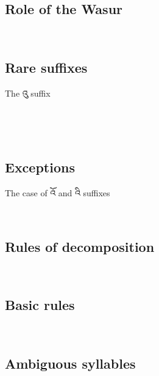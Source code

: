 \documentclass[%
a4paper,%
pagesize,%
12pt,%
parskip=off,%
bibliography=totoc,%
numbers=noenddot,%
DIV=12,%
twoside=semi,%
headings=normal%
]{scrartcl}
\begin{document}
\subsection{Role of the Wasur}

­\subsection{Rare suffixes}
The འུ suffix

­ 

­\subsection{Exceptions}

The case of འོ and འི suffixes

­\subsection{Rules of decomposition}

­\subsection{Basic rules}

­\subsection{Ambiguous syllables}

­



\end{document}
